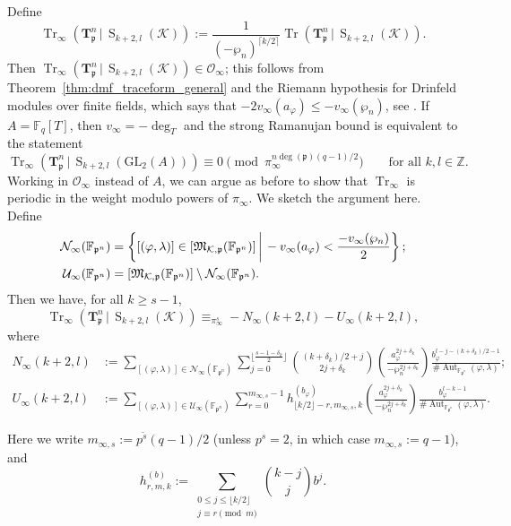 \documentclass[10pt]{article}
\theoremstyle{definition}
\let\phi\varphi
\DeclareMathOperator\Aut{Aut}
\DeclareMathOperator\Tr{Tr}
\renewcommand{\:}{\colon}
\newcommand{\T}{\mathbf{T}}
\renewcommand{\S}{\operatorname{S}}
\newcommand{\bF}{\mathbb{F}}
\begin{document}
Define
\[
\Tr_\infty(\T^n_{\mathfrak p} \, | \, \S_{k+2,l}({\mathcal K})) := \frac{1}{(-\wp_n)^{\lceil k/2 \rceil}} \Tr(\T^n_{\mathfrak p} \, | \, \S_{k+2,l}({\mathcal K})).
\]
Then $\Tr_\infty(\T^n_{\mathfrak p} \, | \, \S_{k+2,l}({\mathcal K})) \in \mathcal O_\infty$; this follows from Theorem~\ref{thm:dmf_traceform_general} and the Riemann hypothesis for Drinfeld modules over finite fields, which says that $-2v_\infty(a_{\phi}) \leq -v_\infty(\wp_n)$, see \cite[Theorem~5.1]{gek_finite}. If $A = \bF_q[T]$, then $v_\infty = -\deg_T$ and the strong Ramanujan bound \cite[Conjecture 4.3]{devries_traces} is equivalent to the statement
\[
\Tr_\infty(\T^n_{\mathfrak p} \, | \, \S_{k+2,l}(\mathrm{GL}_2(A))) \equiv 0 \pmod{\pi_\infty^{n\deg(\mathfrak p)(q-1)/2}} \qquad \text{for all } k,l \in \mathbb Z.
\]
Working in $\mathcal O_\infty$ instead of $A$, we can argue as before to show that $\Tr_\infty$ is periodic in the weight modulo powers of $\pi_\infty$. We sketch the argument here.
Define
\begin{align*}
\mathcal N_\infty(\bF_{\mathfrak p^n}) &= \left\{ [(\phi,\lambda)] \in [\mathfrak M_{{\mathcal K},\mathfrak p}( \bF_{\mathfrak p^n} )] \, \bigg{|} \, -v_\infty(a_{\phi}) < \frac{-v_\infty(\wp_n)}{2} \right \};\\
\mathcal U_\infty(\bF_{\mathfrak p^n}) &= [\mathfrak M_{{\mathcal K},\mathfrak p}( \bF_{\mathfrak p^n} )] \setminus \mathcal N_\infty(\bF_{\mathfrak p^n}).
\end{align*}
Then we have, for all $k \geq s-1$,
\[
\Tr_\infty(\T_{\mathfrak p}^n \, | \, \S_{k+2,l}({\mathcal K})) \equiv_{\pi_\infty^s} -N_\infty(k+2,l) - U_\infty(k+2,l),
\]
where 
\begin{align*}
    N_\infty(k+2,l) &:= \sum_{[(\phi,\lambda)] \in \mathcal N_\infty(\bF_{\mathfrak p^n})} \sum_{j=0}^{\lfloor \frac{s-1-\delta_k}{2}\rfloor} \binom{(k+\delta_k)/2+j}{2j+\delta_k} \left( \frac{a_{\phi}^{2j+\delta_k}}{-\wp_n^{2j+\delta_k}}\right)\frac{b_{\phi}^{l-j-(k+\delta_k)/2-1}}{\# \Aut_{\mathbb F_{\mathfrak p^n}}(\phi,\lambda)};\\
    U_\infty(k+2,l) &:= \sum_{[(\phi,\lambda)] \in \mathcal U_\infty(\bF_{\mathfrak p^n})} \sum_{r=0}^{m_{\infty,s}-1} h^{(b_{\phi})}_{\lfloor k/2 \rfloor - r,m_{\infty,s},k} \left( \frac{a_{\phi}^{2j+\delta_k}}{-\wp_n^{2j+\delta_k}}\right) \frac{b_{\phi}^{l-k-1}}{\# \Aut_{\mathbb F_{\mathfrak p^n}}(\phi,\lambda)}.
\end{align*}

Here we write $m_{\infty,s} := p^{\tilde{s}}(q-1)/2$ (unless $p^s = 2$, in which case $m_{\infty,s} := q-1$), and
\[
h^{(b)}_{r,m,k} := \sum_{\substack{0 \leq j \leq \lfloor k/2 \rfloor \\ j \equiv r \pmod{m}}} \binom{k-j}{j} b^j.
\]
\end{document}
